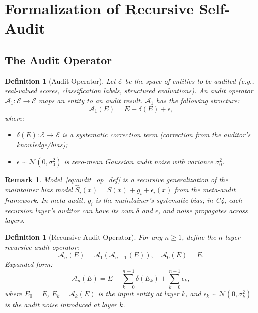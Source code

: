 \documentclass[12pt,a4paper]{article}
\newtheorem{definition}[theorem]{Definition}
\newtheorem{remark}[theorem]{Remark}
\theoremstyle{definition}
\newcommand{\Cfour}{\textsc{C4}}
\newcommand{\AuditOp}{\mathcal{A}}
\begin{document}
\section{Formalization of Recursive Self-Audit}

\subsection{The Audit Operator}

\begin{definition}[Audit Operator]\label{def:audit_op}
Let $\mathcal{E}$ be the space of entities to be audited (e.g., real-valued scores, classification labels, structured evaluations). An audit operator $\AuditOp_1: \mathcal{E} \to \mathcal{E}$ maps an entity to an audit result. $\AuditOp_1$ has the following structure:
\begin{equation}\label{eq:audit_op_def}
    \AuditOp_1(E) = E + \delta(E) + \epsilon,
\end{equation}
where:
\begin{itemize}
    \item $\delta(E): \mathcal{E} \to \mathcal{E}$ is a systematic correction term (correction from the auditor's knowledge/bias);
    \item $\epsilon \sim \mathcal{N}(0, \sigma_0^2)$ is zero-mean Gaussian audit noise with variance $\sigma_0^2$.
\end{itemize}
\end{definition}

\begin{remark}
Model~\eqref{eq:audit_op_def} is a recursive generalization of the maintainer bias model $ \hat{S}_i(x) = S(x) + g_i + \epsilon_i(x) $ from the meta-audit framework. In meta-audit, $g_i$ is the maintainer's systematic bias; in \Cfour, each recursion layer's auditor can have its own $\delta$ and $\epsilon$, and noise propagates across layers.
\end{remark}

\begin{definition}[Recursive Audit Operator]\label{def:recursive_audit}
For any $n \geq 1$, define the $n$-layer recursive audit operator:
\begin{equation}\label{eq:recursive_audit_def}
    \AuditOp_n(E) = \AuditOp_1(\AuditOp_{n-1}(E)), \quad \AuditOp_0(E) = E.
\end{equation}
Expanded form:
\begin{equation}\label{eq:recursive_expanded}
    \AuditOp_n(E) = E + \sum_{k=0}^{n-1} \delta(E_k) + \sum_{k=0}^{n-1} \epsilon_k,
\end{equation}
where $E_0 = E$, $E_k = \AuditOp_k(E)$ is the input entity at layer $k$, and $\epsilon_k \sim \mathcal{N}(0, \sigma_k^2)$ is the audit noise introduced at layer $k$.
\end{definition}
\end{document}
